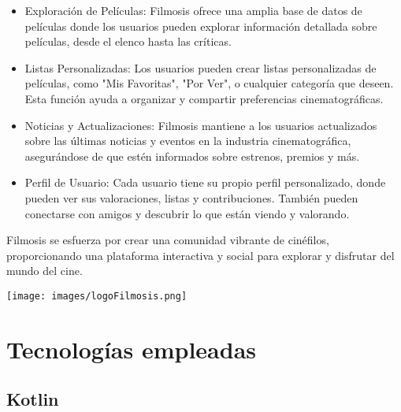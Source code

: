 \documentclass{article}
\begin{document}
        \begin{itemize}
            \item Exploración de Películas: Filmosis ofrece una amplia base de datos de películas donde los usuarios pueden explorar información detallada sobre películas, desde el elenco hasta las críticas.
            
            \item Listas Personalizadas: Los usuarios pueden crear listas personalizadas de películas, como "Mis Favoritas", "Por Ver", o cualquier categoría que deseen. Esta función ayuda a organizar y compartir preferencias cinematográficas.
            
            \item Noticias y Actualizaciones: Filmosis mantiene a los usuarios actualizados sobre las últimas noticias y eventos en la industria cinematográfica, asegurándose de que estén informados sobre estrenos, premios y más.
            
            \item Perfil de Usuario: Cada usuario tiene su propio perfil personalizado, donde pueden ver sus valoraciones, listas y contribuciones. También pueden conectarse con amigos y descubrir lo que están viendo y valorando.
        \end{itemize}
        
        Filmosis se esfuerza por crear una comunidad vibrante de cinéfilos, proporcionando una plataforma interactiva y social para explorar y disfrutar del mundo del cine.
        
        \vspace{1cm}
        
        \begin{minipage}{1\textwidth}
            \centering
            \texttt{[image: images/logoFilmosis.png]}
        \end{minipage}

\section{Tecnologías empleadas}

\subsection{Kotlin}
\end{document}
